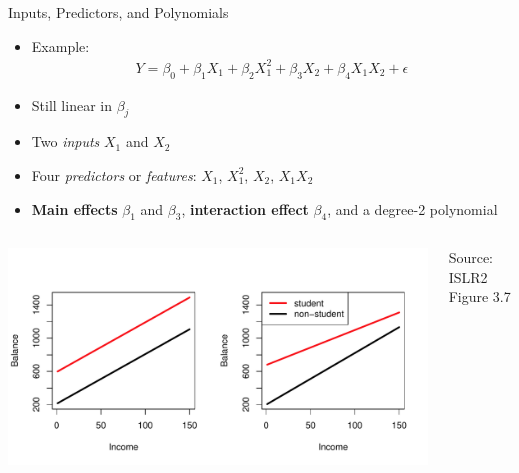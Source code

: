 \documentclass[ignorenonframetext,xcolor=x11names]{beamer}
\begin{document}
\begin{frame}{Inputs, Predictors, and Polynomials}

\begin{itemize}
   \item Example:
\begin{align*}
Y = \beta_0 + \beta_1 X_1 + \beta_2 X_1^2 + \beta_3 X_2 + \beta_4 X_1 X_2 + \epsilon
\end{align*} \vspace{-7mm}
  \item Still linear in $\beta_j$
  \item Two \emph{inputs} $X_1$ and $X_2$
  \item Four \emph{predictors} or \emph{features}: $X_1$, $X_1^2$, $X_2$, $X_1 X_2$
  \item \textbf{Main effects} $\beta_1$ and $\beta_3$, \textbf{interaction effect} $\beta_4$, and a degree-2 polynomial
\end{itemize}
\begin{columns}
\begin{column}{0.85\textwidth}
\includegraphics[width=\textwidth]{../class11/Figures_Chapters_1-6/Chapter3/3_7.pdf} 
\end{column}
\begin{column}{0.15\textwidth}
\scriptsize Source: ISLR2 Figure 3.7
\end{column}
\end{columns}
\end{frame}
\end{document}
